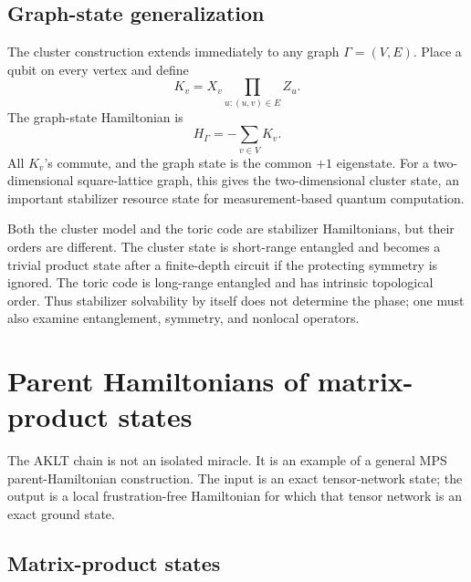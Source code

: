 \subsection{Graph-state generalization}
\label{subsec:graph-state-generalization}

The cluster construction extends immediately to any graph \(\Gamma=(V,E)\).
Place a qubit on every vertex and define
\begin{equation}
\label{eq:graph-state-stabilizers}
    K_v
    =
    X_v\prod_{u:(u,v)\in E}Z_u .
\end{equation}
The graph-state Hamiltonian is
\begin{equation}
\label{eq:graph-state-hamiltonian}
    H_\Gamma=-\sum_{v\in V}K_v .
\end{equation}
All \(K_v\)'s commute, and the graph state is the common \(+1\) eigenstate.
For a two-dimensional square-lattice graph, this gives the two-dimensional
cluster state, an important stabilizer resource state for measurement-based
quantum computation.

\begin{remark}
Both the cluster model and the toric code are stabilizer Hamiltonians, but their
orders are different.  The cluster state is short-range entangled and becomes a
trivial product state after a finite-depth circuit if the protecting symmetry is
ignored.  The toric code is long-range entangled and has intrinsic topological
order.  Thus stabilizer solvability by itself does not determine the phase;
one must also examine entanglement, symmetry, and nonlocal operators.
\end{remark}

\section{Parent Hamiltonians of matrix-product states}
\label{sec:mps-parent-hamiltonians}

The AKLT chain is not an isolated miracle.  It is an example of a general MPS
parent-Hamiltonian construction.  The input is an exact tensor-network state;
the output is a local frustration-free Hamiltonian for which that tensor network
is an exact ground state.

\subsection{Matrix-product states}
\label{subsec:mps-definition-parent}

